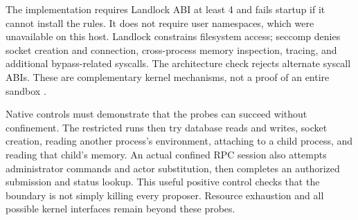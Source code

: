 The implementation requires Landlock ABI at least 4 and fails startup if it
cannot install the rules. It does not require user namespaces, which were
unavailable on this host. Landlock constrains filesystem access; seccomp denies
socket creation and connection, cross-process memory inspection, tracing, and
additional bypass-related syscalls. The architecture check rejects alternate
syscall ABIs. These are complementary kernel mechanisms, not a proof of an
entire sandbox \cite{landlock,seccomp}.

Native controls must demonstrate that the probes can succeed without
confinement. The restricted runs then try database reads and writes, socket
creation, reading another process's environment, attaching to a child process,
and reading that child's memory. An actual confined RPC session also attempts
administrator commands and actor substitution, then completes an authorized
submission and status lookup. This useful positive control checks that the
boundary is not simply killing every proposer. Resource exhaustion and all
possible kernel interfaces remain beyond these probes.
